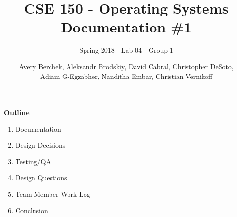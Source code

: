 \documentclass[12pt]{article}
\title{CSE 150 - Operating Systems \\ Documentation \#1}
\subtitle{Spring 2018 - Lab 04 - Group 1}
\author{Avery Berchek, Aleksandr Brodskiy, David Cabral, Christopher DeSoto,\\Adiam G-Egzabher, Nanditha Embar, Christian Vernikoff}
\begin{document}
\maketitle
{\setlength{\parindent}{0cm}
\textbf{Outline}
\begin{enumerate}  
\item Documentation
\item Design Decisions
\item Testing/QA
\item Design Questions
\item Team Member Work-Log
\item Conclusion\\\\\\\\\\\\\\\\
\end{enumerate} 
}
\end{document}

